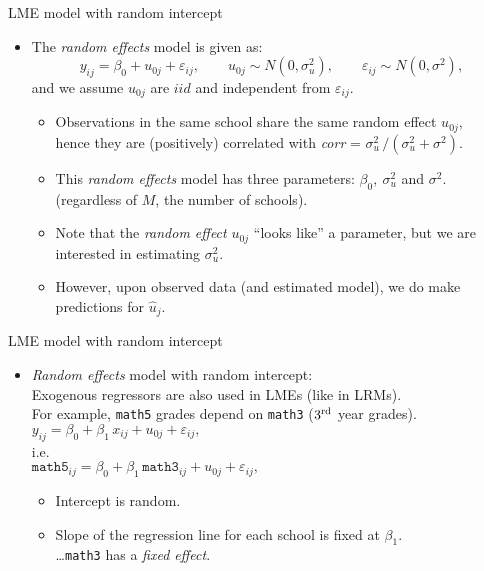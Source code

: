 \documentclass{beamer}
\begin{document}
\begin{frame}{LME model with random intercept}
\begin{itemize}
\item The \textit{random effects} model is given as:
$$ y_{ij} = \beta_{0} + u_{0j} + \varepsilon_{ij}, \qquad u_{0j} \sim N(0,\sigma^2_u), \qquad \varepsilon_{ij} \sim N(0,\sigma^2), $$
and we assume $u_{0j}$ are $iid$ and independent from $\varepsilon_{ij}$.\\
\smallskip
\begin{itemize}
\item Observations in the same school share the same random effect $u_{0j}$,\\ hence they are (positively) correlated with \textit{corr} = $\sigma^2_u \, / (\sigma^2_u + \sigma^2)$.
\smallskip 
\item This \textit{random effects} model has three parameters: $\beta_{0},~ \sigma^2_u$ and $\sigma^2$. (regardless of $M$, the number of schools).
\smallskip 
\item Note that the \textit{random effect} $u_{0j}$ ``looks like'' a parameter, but we are interested in estimating $\sigma^2_u$.
\smallskip 
\item However, upon observed data (and estimated model), we do make predictions for $\hat{u}_j$.
\end{itemize}
\end{itemize}
\end{frame}
\begin{frame}{LME model with random intercept}
\begin{itemize}
\item \textit{Random effects} model with random intercept:\\
\bigskip
Exogenous regressors are also used in LMEs (like in LRMs).\\
\smallskip
For example, \texttt{math5} grades depend on \texttt{math3} ($3{^{\textnormal{rd}}}$ year grades).\\
\medskip
$ y_{ij} = \beta_{0} + \beta_1 \, x_{ij} + u_{0j} + \varepsilon_{ij}, $\\
\medskip
i.e.\\
$ \texttt{math5}_{ij} = \beta_{0} + \beta_1 \, \texttt{math3}_{ij} + u_{0j} + \varepsilon_{ij}, $\\
\medskip
\begin{itemize}
\item Intercept is random.
\smallskip
\item Slope of the regression line for each school is fixed at $\beta_1$.\\
\dots \texttt{math3} has a \textit{fixed effect}.
\end{itemize}
\end{itemize}
\end{frame}
\end{document}
